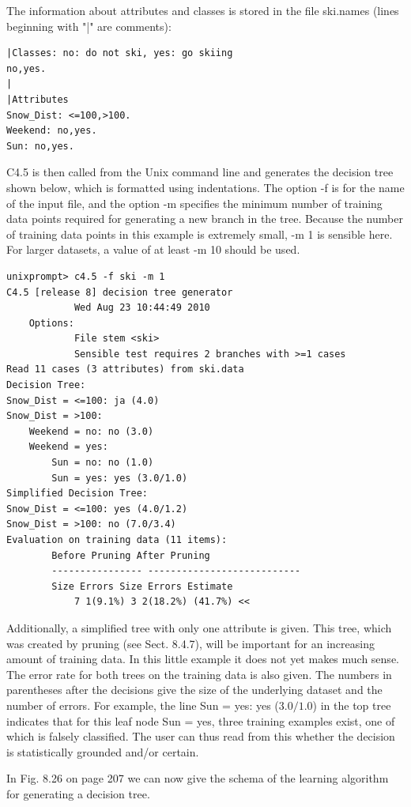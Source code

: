 \documentclass[10pt]{book}
\begin{document}
The information about attributes and classes is stored in the file ski.names (lines beginning with "|" are comments):

\begin{verbatim}
|Classes: no: do not ski, yes: go skiing
no,yes.
|
|Attributes
Snow_Dist: <=100,>100.
Weekend: no,yes.
Sun: no,yes.
\end{verbatim}

C4.5 is then called from the Unix command line and generates the decision tree shown below, which is formatted using indentations. The option -f is for the name of the input file, and the option -m specifies the minimum number of training data points required for generating a new branch in the tree. Because the number of training data points in this example is extremely small, -m 1 is sensible here. For larger datasets, a value of at least -m 10 should be used.

\begin{verbatim}
unixprompt> c4.5 -f ski -m 1
C4.5 [release 8] decision tree generator
            Wed Aug 23 10:44:49 2010
    Options:
            File stem <ski>
            Sensible test requires 2 branches with >=1 cases
Read 11 cases (3 attributes) from ski.data
Decision Tree:
Snow_Dist = <=100: ja (4.0)
Snow_Dist = >100:
    Weekend = no: no (3.0)
    Weekend = yes:
        Sun = no: no (1.0)
        Sun = yes: yes (3.0/1.0)
Simplified Decision Tree:
Snow_Dist = <=100: yes (4.0/1.2)
Snow_Dist = >100: no (7.0/3.4)
Evaluation on training data (11 items):
        Before Pruning After Pruning
        ---------------- ---------------------------
        Size Errors Size Errors Estimate
            7 1(9.1%) 3 2(18.2%) (41.7%) <<
\end{verbatim}

Additionally, a simplified tree with only one attribute is given. This tree, which was created by pruning (see Sect. 8.4.7), will be important for an increasing amount of training data. In this little example it does not yet makes much sense. The error rate for both trees on the training data is also given. The numbers in parentheses after the decisions give the size of the underlying dataset and the number of errors. For example, the line Sun = yes: yes ($3.0/1.0$) in the top tree indicates that for this leaf node Sun = yes, three training examples exist, one of which is falsely classified. The user can thus read from this whether the decision is statistically grounded and/or certain.

In Fig. 8.26 on page 207 we can now give the schema of the learning algorithm for generating a decision tree.
\end{document}
